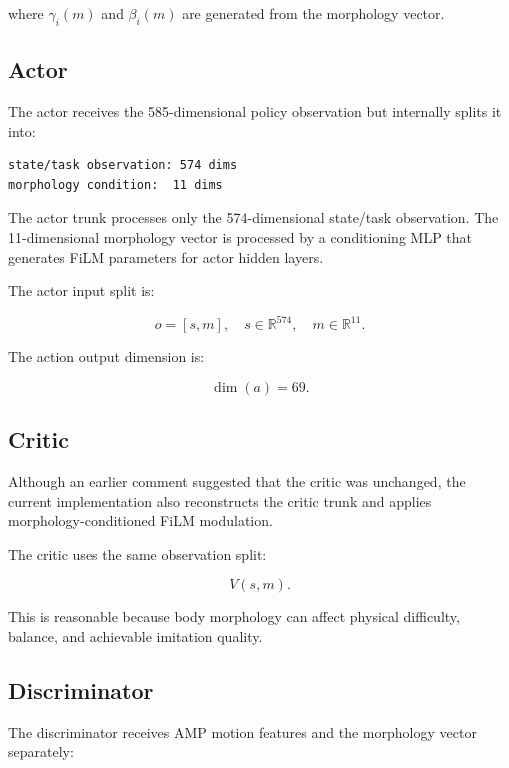 \documentclass[11pt,a4paper]{article}
\begin{document}
where $\gamma_i(m)$ and $\beta_i(m)$ are generated from the morphology vector.

\subsection{Actor}

The actor receives the 585-dimensional policy observation but internally splits it into:

\begin{lstlisting}
state/task observation: 574 dims
morphology condition:  11 dims
\end{lstlisting}

The actor trunk processes only the 574-dimensional state/task observation. The 11-dimensional morphology vector is processed by a conditioning MLP that generates FiLM parameters for actor hidden layers.

The actor input split is:

\begin{equation}
    o = [s, m], \quad s \in \mathbb{R}^{574}, \quad m \in \mathbb{R}^{11}.
\end{equation}

The action output dimension is:

\begin{equation}
    \dim(a)=69.
\end{equation}

\subsection{Critic}

Although an earlier comment suggested that the critic was unchanged, the current implementation also reconstructs the critic trunk and applies morphology-conditioned FiLM modulation.

The critic uses the same observation split:

\begin{equation}
    V(s,m).
\end{equation}

This is reasonable because body morphology can affect physical difficulty, balance, and achievable imitation quality.

\subsection{Discriminator}

The discriminator receives AMP motion features and the morphology vector separately:
\end{document}
